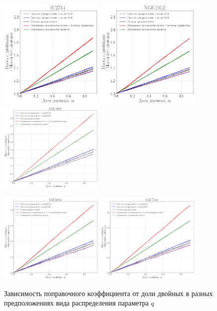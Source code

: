 \documentclass[a4paper,12pt]{article}
\begin{document}
\begin{figure}[h!]
	\centering
	\begin{multicols}{3}
	\includegraphics[width=5cm]{images/alphas_IC2714}
	\columnbreak
	\includegraphics[width=5cm]{images/alphas_NGC1912}
	\columnbreak
	\includegraphics[width=5cm]{images/alphas_NGC2099}
	\end{multicols}
	
	\begin{multicols}{2}
	\includegraphics[width=5cm]{images/alphas_NGC6834}
	\columnbreak
	\includegraphics[width=5cm]{images/alphas_NGC7142}

	\end{multicols}
	\caption{Зависимость поправочного коэффициента от доли двойных в разных предположениях вида распределения параметра $q$}
	\label{results_g}
\end{figure}
\end{document}
